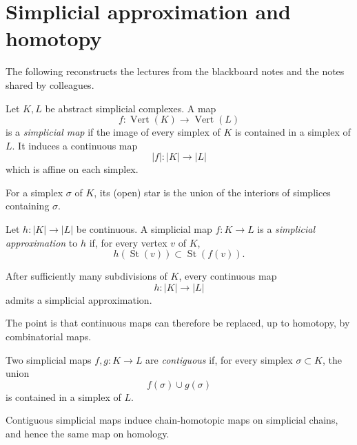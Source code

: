 \section{Simplicial approximation and homotopy}
\label{section-simplicial-approximation-homotopy}

\noindent
The following reconstructs the lectures from the
blackboard notes and the notes shared by colleagues.

\begin{definition}
\label{definition-simplicial-map}
Let $K,L$ be abstract simplicial complexes.
A map
\[
f:\operatorname{Vert}(K)\longrightarrow
\operatorname{Vert}(L)
\]
is a {\it simplicial map} if the image of every
simplex of $K$ is contained in a simplex of $L$.
It induces a continuous map
\[
|f|:|K|\longrightarrow |L|
\]
which is affine on each simplex.
\end{definition}

\begin{definition}
\label{definition-star-of-simplex}
For a simplex $\sigma$ of $K$, its (open) star is
the union of the interiors of simplices containing
$\sigma$.
\end{definition}

\begin{definition}
\label{definition-simplicial-approximation}
Let $h:|K|\to |L|$ be continuous. A simplicial map
$f:K\to L$ is a {\it simplicial approximation} to
$h$ if, for every vertex $v$ of $K$,
\[
h(\operatorname{St}(v))
\subset
\operatorname{St}(f(v)).
\]
\end{definition}

\begin{theorem}
\label{theorem-simplicial-approximation}
After sufficiently many subdivisions of $K$, every
continuous map
\[
h:|K|\longrightarrow |L|
\]
admits a simplicial approximation.
\end{theorem}

\noindent
The point is that continuous maps can therefore be
replaced, up to homotopy, by combinatorial maps.

\begin{definition}
\label{definition-contiguous-simplicial-maps}
Two simplicial maps $f,g:K\to L$ are
{\it contiguous} if, for every simplex
$\sigma\subset K$, the union
\[
f(\sigma)\cup g(\sigma)
\]
is contained in a simplex of $L$.
\end{definition}

\begin{proposition}
\label{proposition-contiguous-chain-homotopic}
Contiguous simplicial maps induce chain-homotopic
maps on simplicial chains, and hence the same map
on homology.
\end{proposition}

